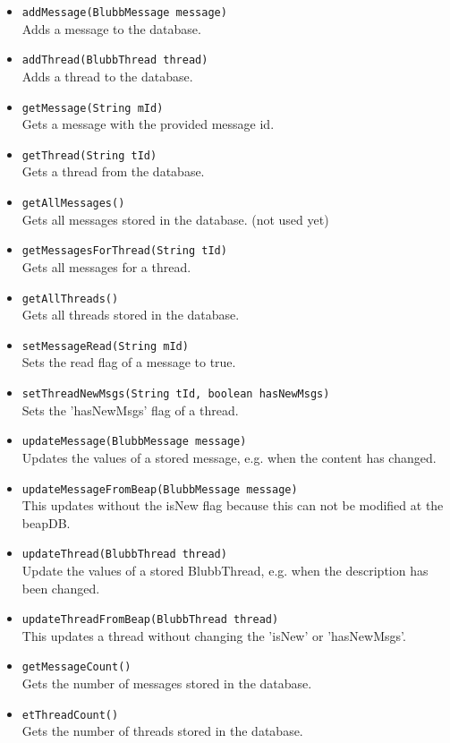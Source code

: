 \documentclass[12pt,a4paper,oneside]{report}
\newcommand{\code}[1]{\lstinline{#1}}
\begin{document}
\begin{itemize}
\item{\code{addMessage(BlubbMessage message)} 
\\Adds a message to the database.}
\item{\code{addThread(BlubbThread thread)}
\\Adds a thread to the database.}
\item{\code{getMessage(String mId)}
\\Gets a message with the provided message id.}
\item{\code{getThread(String tId)}
\\Gets a thread from the database.}
\item{\code{getAllMessages()}
\\Gets all messages stored in the database. (not used yet)}
\item{\code{getMessagesForThread(String tId)}
\\Gets all messages for a thread.}
\item{\code{getAllThreads()}
\\Gets all threads stored in the database.}
\item{\code{setMessageRead(String mId)}
\\Sets the read flag of a message to true.}
\item{\code{setThreadNewMsgs(String tId, boolean hasNewMsgs)}
\\Sets the 'hasNewMsgs' flag of a thread.}
\item{\code{updateMessage(BlubbMessage message)}
\\Updates the values of a stored message, e.g. when the content has changed.}
\item{\code{updateMessageFromBeap(BlubbMessage message)}
\\This updates without the isNew flag because this can not be modified at the beapDB.}
\item{\code{updateThread(BlubbThread thread)}
\\Update the values of a stored BlubbThread, e.g. when the description has been changed.}
\item{\code{updateThreadFromBeap(BlubbThread thread)}
\\This updates a thread without changing the 'isNew' or 'hasNewMsgs'.}
\item{\code{getMessageCount()}
\\Gets the number of messages stored in the database.}
\item{\code{etThreadCount()}
\\Gets the number of threads stored in the database.}
\end{itemize}
\end{document}
